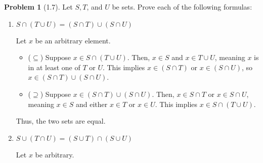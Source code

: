 \documentclass[12pt]{article}
\theoremstyle{definition}
\newtheorem{problem}{Problem}
\begin{document}
\begin{problem}[1.7]

    Let $S, T$, and $U$ be sets. Prove each of the following formulas:

    \begin{enumerate}[label=(\alph*)]
        \item $S \cap (T \cup U) = (S \cap T) \cup (S \cap U)$
        \begin{solution}

            Let \( x \) be an arbitrary element.

            \begin{itemize}
                \item (\(\subseteq\)) Suppose \( x \in S \cap (T \cup U) \). Then, \( x \in S \) and \( x \in T \cup U \), meaning \( x \) is in at least one of \( T \) or \( U \). This implies \( x \in (S \cap T) \) or \( x \in (S \cap U) \), so \( x \in (S \cap T) \cup (S \cap U) \).
                \item (\(\supseteq\)) Suppose \( x \in (S \cap T) \cup (S \cap U) \). Then, \( x \in S \cap T \) or \( x \in S \cap U \), meaning \( x \in S \) and either \( x \in T \) or \( x \in U \). This implies \( x \in S \cap (T \cup U) \).
            \end{itemize}
            Thus, the two sets are equal.
        \end{solution}
        \item $S \cup (T \cap U) = (S \cup T) \cap (S \cup U)$
        
        \begin{solution}
            Let \( x \) be arbitrary.


\end{solution}
\end{enumerate}
\end{problem}
\end{document}
